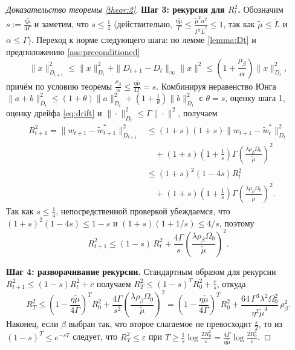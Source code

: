 \begin{proof}[Доказательство теоремы \ref{theor:2}]
\textbf{Шаг 3: рекурсия для $R_t^2$.}
Обозначим $s := \frac{\eta\widetilde{\mu}}{4\Gamma}$ и заметим, что $s \le \frac{1}{4}$ (действительно, $\frac{\eta\widetilde{\mu}}{\Gamma} \le \frac{\widetilde{\mu}^2\alpha^2}{\Gamma^2\widetilde{L}^2} \le 1$, так как $\widetilde{\mu} \le \widetilde{L}$ и $\alpha \le \Gamma$). Переход к норме следующего шага: по лемме \ref{lemma:Dt} и предположению \ref{ass:preconditioned}
\begin{equation*}
    \|x\|_{D_{t+1}}^2 \le \|x\|_{D_t}^2 + \|D_{t+1} - D_t\|_\infty \|x\|^2 \le \left(1 + \frac{\rho_\beta}{\alpha}\right)\|x\|_{D_t}^2,
\end{equation*}
причём по условию теоремы $\frac{\rho_\beta}{\alpha} \le \frac{\eta\widetilde{\mu}}{4\Gamma} = s$. Комбинируя неравенство Юнга $\|a + b\|_{D_t}^2 \le (1+\theta)\|a\|_{D_t}^2 + (1 + \frac{1}{\theta})\|b\|_{D_t}^2$ с $\theta = s$, оценку шага 1, оценку дрейфа \eqref{eq:drift} и $\|\cdot\|^2_{D_t} \le \Gamma\|\cdot\|^2$, получаем
\begin{equation*}
\begin{split}
    R_{t+1}^2 = \|w_{t+1} - \widetilde{w}^*_{t+1}\|^2_{D_{t+1}} &\le (1+s)(1+s)\|w_{t+1} - \widetilde{w}^*_t\|_{D_t}^2 \\
    &\quad + (1+s)\left(1 + \frac{1}{s}\right)\Gamma\left(\frac{\lambda\rho_\beta\Omega_0}{\widetilde{\mu}}\right)^2 \\
    &\le (1+s)^2\left(1 - 4s\right)R_t^2 \\
    &\quad + (1+s)\left(1+\frac{1}{s}\right)\Gamma\left(\frac{\lambda\rho_\beta\Omega_0}{\widetilde{\mu}}\right)^2.
\end{split}
\end{equation*}
Так как $s \le \frac14$, непосредственной проверкой убеждаемся, что $(1+s)^2(1-4s) \le 1-s$ и $(1+s)(1+1/s) \le 4/s$, поэтому
\begin{equation*}
    R_{t+1}^2 \le (1 - s)\,R_t^2 + \frac{4\Gamma}{s}\left(\frac{\lambda\rho_\beta\Omega_0}{\widetilde{\mu}}\right)^2.
\end{equation*}

\textbf{Шаг 4: разворачивание рекурсии.}
Стандартным образом для рекурсии $R_{t+1}^2 \le (1-s)R_t^2 + c$ получаем $R_T^2 \le (1-s)^T R_0^2 + \frac{c}{s}$, откуда
\begin{equation*}
    R_T^2 \le \left(1 - \frac{\eta\widetilde{\mu}}{4\Gamma}\right)^T R_0^2 + \frac{4\Gamma}{s^2}\left(\frac{\lambda\rho_\beta\Omega_0}{\widetilde{\mu}}\right)^2
    = \left(1 - \frac{\eta\widetilde{\mu}}{4\Gamma}\right)^T R_0^2 + \frac{64\,\Gamma^3 \lambda^2 \Omega_0^2}{\eta^2 \widetilde{\mu}^4}\,\rho_\beta^2.
\end{equation*}
Наконец, если $\beta$ выбран так, что второе слагаемое не превосходит $\frac{\varepsilon}{2}$, то из $(1-s)^T \le e^{-sT}$ следует, что $R_T^2 \le \varepsilon$ при $T \ge \frac{1}{s}\log\frac{2R_0^2}{\varepsilon} = \frac{4\Gamma}{\eta\widetilde{\mu}}\log\frac{2R_0^2}{\varepsilon}$.
\end{proof}

